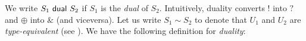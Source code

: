 
We write $S_1 \ \mathsf{dual}\  S_2$ if 
$S_1$ is the \emph{dual} of $S_2$.   
Intuitively, 
duality
converts $!$ into $?$ and $\oplus$ into $\&$ (and viceversa). 
Let us write $S_1 \sim S_2$
to denote that $U_1$ and $U_2$ are \emph{type-equivalent} (see 
).
We have the following definition for 
\emph{duality}:

%	


